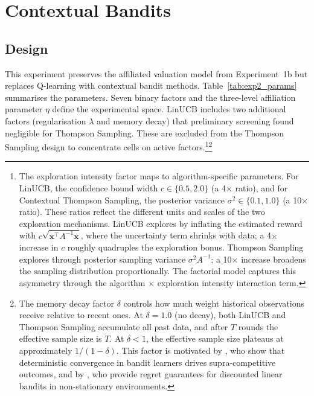 \section{Contextual Bandits}
\label{sec:bandits_results}

\subsection{Design}
\label{sec:bandits_design}

This experiment preserves the affiliated valuation model from Experiment~1b but replaces Q-learning with contextual bandit methods. Table~\ref{tab:exp2_params} summarises the parameters. Seven binary factors and the three-level affiliation parameter $\eta$ define the experimental space. LinUCB includes two additional factors (regularisation $\lambda$ and memory decay) that preliminary screening found negligible for Thompson Sampling. These are excluded from the Thompson Sampling design to concentrate cells on active factors.\footnote{The exploration intensity factor maps to algorithm-specific parameters. For LinUCB, the confidence bound width $c \in \{0.5, 2.0\}$ (a 4$\times$ ratio), and for Contextual Thompson Sampling, the posterior variance $\sigma^2 \in \{0.1, 1.0\}$ (a 10$\times$ ratio). These ratios reflect the different units and scales of the two exploration mechanisms. LinUCB explores by inflating the estimated reward with $c\sqrt{\mathbf{x}^\top A^{-1}\mathbf{x}}$, where the uncertainty term shrinks with data; a 4$\times$ increase in $c$ roughly quadruples the exploration bonus. Thompson Sampling explores through posterior sampling variance $\sigma^2 A^{-1}$; a 10$\times$ increase broadens the sampling distribution proportionally. The factorial model captures this asymmetry through the algorithm $\times$ exploration intensity interaction term.}\footnote{The memory decay factor $\delta$ controls how much weight historical observations receive relative to recent ones. At $\delta = 1.0$ (no decay), both LinUCB and Thompson Sampling accumulate all past data, and after $T$ rounds the effective sample size is $T$. At $\delta < 1$, the effective sample size plateaus at approximately $1/(1-\delta)$. This factor is motivated by \citet{Douglas2024}, who show that deterministic convergence in bandit learners drives supra-competitive outcomes, and by \citet{Russac2019}, who provide regret guarantees for discounted linear bandits in non-stationary environments.}

